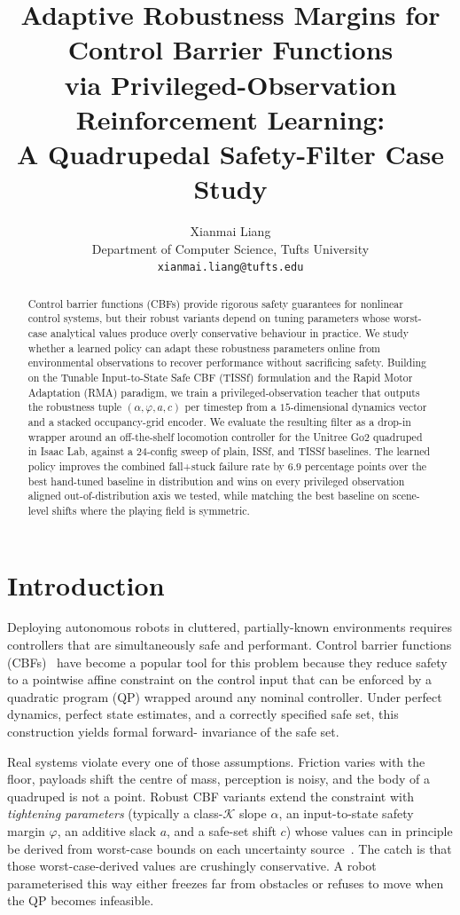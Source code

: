 \documentclass{article}
\title{Adaptive Robustness Margins for Control Barrier Functions \\
       via Privileged-Observation Reinforcement Learning: \\
       A Quadrupedal Safety-Filter Case Study}
\author{Xianmai Liang \\
        Department of Computer Science, Tufts University \\
        \texttt{xianmai.liang@tufts.edu}}
\date{\vspace{-1em}}
\begin{document}
\maketitle

\begin{abstract}
\noindent
Control barrier functions (CBFs) provide rigorous safety guarantees for nonlinear
control systems, but their robust variants depend on tuning parameters whose
worst-case analytical values produce overly conservative behaviour in practice.
We study whether a learned policy can adapt these robustness parameters online
from environmental observations to recover performance without sacrificing
safety. Building on the Tunable Input-to-State Safe CBF (TISSf) formulation and
the Rapid Motor Adaptation (RMA) paradigm, we train a privileged-observation
teacher that outputs the robustness tuple $(\alpha,\varphi,a,c)$ per timestep
from a $15$-dimensional dynamics vector and a stacked occupancy-grid encoder.
We evaluate the resulting filter as a drop-in wrapper around an off-the-shelf
locomotion controller for the Unitree Go2 quadruped in Isaac Lab, against a
$24$-config sweep of plain, ISSf, and TISSf baselines. The learned policy
improves the combined fall+stuck failure rate by $6.9$ percentage points over
the best hand-tuned baseline in distribution and wins on every privileged
observation aligned out-of-distribution axis we tested, while matching the best
baseline on scene-level shifts where the playing field is symmetric.
\end{abstract}

\section{Introduction}
\label{sec:intro}

Deploying autonomous robots in cluttered, partially-known environments requires
controllers that are simultaneously safe and performant. Control barrier
functions (CBFs)~\citep{ames2019control} have become a popular tool for this
problem because they reduce safety to a pointwise affine constraint on the
control input that can be enforced by a quadratic program (QP) wrapped around
any nominal controller. Under perfect dynamics, perfect state estimates, and a
correctly specified safe set, this construction yields formal forward-
invariance of the safe set.

Real systems violate every one of those assumptions. Friction varies with the
floor, payloads shift the centre of mass, perception is noisy, and the body of
a quadruped is not a point. Robust CBF variants extend the constraint with
\emph{tightening parameters} (typically a class-$\mathcal{K}$ slope $\alpha$, an
input-to-state safety margin $\varphi$, an additive slack $a$, and a safe-set
shift $c$) whose values can in principle be derived from worst-case bounds on
each uncertainty source~\citep{kolathaya2018input,cosner2022safety}. The
catch is that those worst-case-derived values are crushingly conservative. A robot
parameterised this way either freezes far from obstacles or refuses to move
when the QP becomes infeasible.
\end{document}
